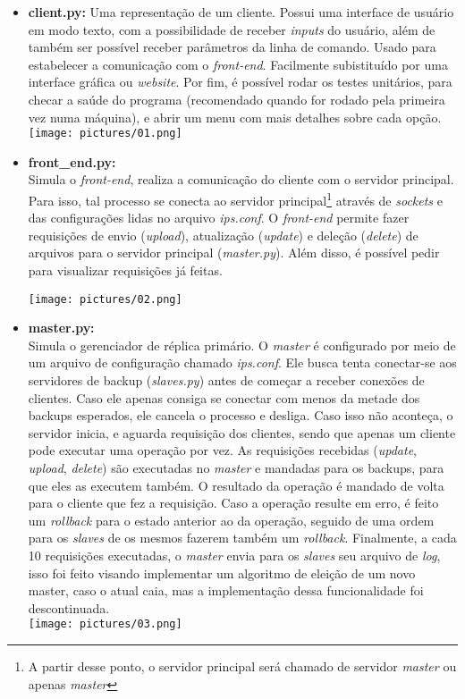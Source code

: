 \documentclass[12pt,a4paper]{article}
\begin{document}
		\begin{itemize}
			\item \textbf{client.py:} Uma representação de um cliente. Possui uma interface de usuário em modo texto, com a possibilidade de receber \textit{inputs} do usuário, além de também ser possível receber parâmetros da linha de comando. Usado para estabelecer a comunicação com o \textit{front-end}. Facilmente subistituído por uma interface gráfica ou \textit{website}. Por fim, é possível rodar os testes unitários, para checar a saúde do programa (recomendado quando for rodado pela primeira vez numa máquina), e abrir um menu com mais detalhes sobre cada opção.\\
			\texttt{[image: pictures/01.png]}
			
			\item \textbf{front\_end.py:}\\Simula o \textit{front-end}, realiza a comunicação do cliente com o servidor principal. Para isso, tal processo se conecta ao servidor principal\footnote{A partir desse ponto, o servidor principal será chamado de servidor \textit{master} ou apenas \textit{master}} através de \textit{sockets} e das configurações lidas no arquivo \textit{ips.conf}. O \textit{front-end} permite fazer requisições de envio (\textit{upload}), atualização (\textit{update}) e deleção (\textit{delete}) de arquivos para o servidor principal (\textit{master.py}). Além disso, é possível pedir para visualizar requisições já feitas.
				
				\texttt{[image: pictures/02.png]}
			
			\item \textbf{master.py:}\\Simula o gerenciador de réplica primário. O \textit{master} é configurado por meio de um arquivo de configuração chamado \textit{ips.conf}. Ele busca tenta conectar-se aos servidores de backup (\textit{slaves.py}) antes de começar a receber conexões de clientes. Caso ele apenas consiga se conectar com menos da metade dos backups esperados, ele cancela o processo e desliga. Caso isso não aconteça, o servidor inicia, e aguarda requisição dos clientes, sendo que apenas um cliente pode executar uma operação por vez. As requisições recebidas (\textit{update}, \textit{upload}, \textit{delete}) são executadas no \textit{master} e mandadas para os backups, para que eles as executem também. O resultado da operação é mandado de volta para o cliente que fez a requisição. Caso a operação resulte em erro, é feito um \textit{rollback} para o estado anterior ao da operação, seguido de uma ordem para os \textit{slaves} de os mesmos fazerem também um \textit{rollback}. Finalmente, a cada 10 requisições executadas, o \textit{master} envia para os \textit{slaves} seu arquivo de \textit{log}, isso foi feito visando implementar um algoritmo de eleição de um novo master, caso o atual caia, mas a implementação dessa funcionalidade foi descontinuada.\\
				\texttt{[image: pictures/03.png]}
				

\end{itemize}
\end{document}
